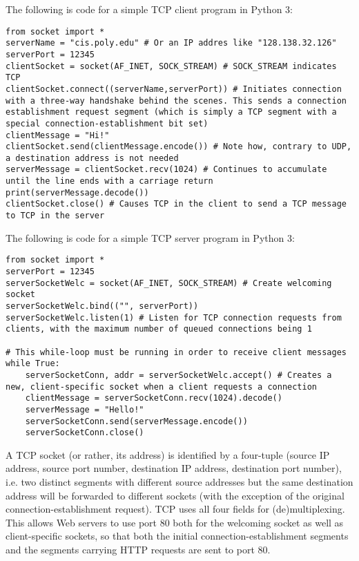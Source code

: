\documentclass[8pt, table, xcdraw]{article}%
\begin{document}
The following is code for a simple TCP client program in Python 3:

\begin{lstlisting}
from socket import *
serverName = "cis.poly.edu" # Or an IP addres like "128.138.32.126"
serverPort = 12345
clientSocket = socket(AF_INET, SOCK_STREAM) # SOCK_STREAM indicates TCP
clientSocket.connect((serverName,serverPort)) # Initiates connection with a three-way handshake behind the scenes. This sends a connection establishment request segment (which is simply a TCP segment with a special connection-establishment bit set)
clientMessage = "Hi!"
clientSocket.send(clientMessage.encode()) # Note how, contrary to UDP, a destination address is not needed
serverMessage = clientSocket.recv(1024) # Continues to accumulate until the line ends with a carriage return
print(serverMessage.decode())
clientSocket.close() # Causes TCP in the client to send a TCP message to TCP in the server
\end{lstlisting}

The following is code for a simple TCP server program in Python 3:

\begin{lstlisting}
from socket import *
serverPort = 12345
serverSocketWelc = socket(AF_INET, SOCK_STREAM) # Create welcoming socket
serverSocketWelc.bind(("", serverPort))
serverSocketWelc.listen(1) # Listen for TCP connection requests from clients, with the maximum number of queued connections being 1

# This while-loop must be running in order to receive client messages
while True:
    serverSocketConn, addr = serverSocketWelc.accept() # Creates a new, client-specific socket when a client requests a connection
    clientMessage = serverSocketConn.recv(1024).decode()
    serverMessage = "Hello!"
    serverSocketConn.send(serverMessage.encode())
    serverSocketConn.close()
\end{lstlisting}

A TCP socket (or rather, its address) is identified by a four-tuple (source IP address, source port number, destination IP address, destination port number), i.e. two distinct segments with different source addresses but the same destination address will be forwarded to different sockets (with the exception of the original connection-establishment request). TCP uses all four fields for (de)multiplexing. This allows Web servers to use port 80 both for the welcoming socket as well as client-specific sockets, so that both the initial connection-establishment segments and the segments carrying HTTP requests are sent to port 80.
\end{document}
